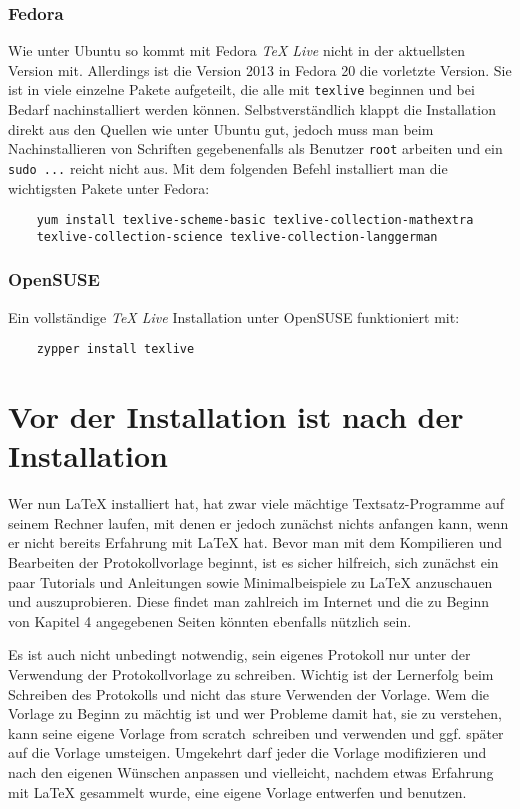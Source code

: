 \subsubsection{Fedora}
Wie unter Ubuntu so kommt mit Fedora \textit{TeX Live} nicht in der aktuellsten Version mit.
Allerdings ist die Version 2013 in Fedora 20 die vorletzte Version.
Sie ist in viele einzelne Pakete aufgeteilt, die alle mit \verb|texlive| beginnen und bei Bedarf nachinstalliert werden können.
Selbstverständlich klappt die Installation direkt aus den Quellen wie unter Ubuntu gut, jedoch muss man beim Nachinstallieren von Schriften gegebenenfalls als Benutzer \verb|root| arbeiten und ein \verb|sudo ...| reicht nicht aus.
Mit dem folgenden Befehl installiert man die wichtigsten Pakete unter Fedora:
\begin{verbatim}
	yum install texlive-scheme-basic texlive-collection-mathextra
	texlive-collection-science texlive-collection-langgerman 
\end{verbatim}

\subsubsection{OpenSUSE}
Ein vollständige \textit{TeX Live} Installation unter OpenSUSE funktioniert mit:
\begin{verbatim}
	zypper install texlive
\end{verbatim}

\section{Vor der Installation ist nach der Installation}
Wer nun LaTeX installiert hat, hat zwar viele mächtige Textsatz-Programme auf seinem Rechner laufen, mit denen er jedoch zunächst nichts anfangen kann, wenn er nicht bereits Erfahrung mit LaTeX hat. Bevor man mit dem Kompilieren und Bearbeiten der Protokollvorlage beginnt, ist es sicher hilfreich, sich zunächst ein paar Tutorials und Anleitungen sowie Minimalbeispiele zu LaTeX anzuschauen und auszuprobieren. Diese findet man zahlreich im Internet und die zu Beginn von Kapitel 4 angegebenen Seiten könnten ebenfalls nützlich sein.

Es ist auch nicht unbedingt notwendig, sein eigenes Protokoll nur unter der Verwendung der Protokollvorlage zu schreiben. Wichtig ist der Lernerfolg beim Schreiben des Protokolls und nicht das sture Verwenden der Vorlage. Wem die Vorlage zu Beginn zu mächtig ist und wer Probleme damit hat, sie zu verstehen, kann seine eigene Vorlage \glqq from scratch\grqq\ schreiben und verwenden und ggf. später auf die Vorlage umsteigen. Umgekehrt darf jeder die Vorlage modifizieren und nach den eigenen Wünschen anpassen und vielleicht, nachdem etwas Erfahrung mit LaTeX gesammelt wurde, eine eigene Vorlage entwerfen und benutzen.